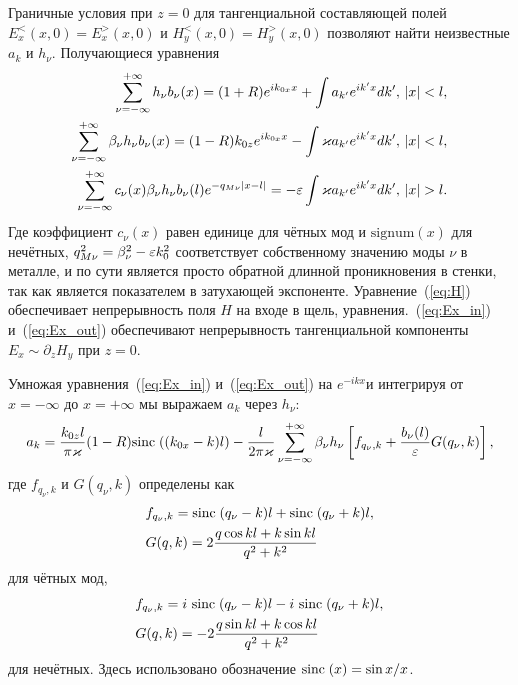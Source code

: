  Граничные условия при $z = 0$ для тангенциальной составляющей полей $E_x^<(x,0) = E_x^>(x,0) $ и $H_y^<(x,0) = H_y^>(x,0)$ 
 позволяют найти неизвестные $a_k$ и $h_\nu$. Получающиеся уравнения
\begin{align}
\sum_{\nu = -\infty}^{+\infty} h_\nu b_\nu (x) = (1+R)e^{ik_{0x}x} 
+ \int a_{k'} e^{ik'x} dk', & \ \abs{x}<l, \label{eq:H} \\
\sum_{\nu = -\infty}^{+\infty} \beta_\nu h_\nu b_\nu(x) = (1-R)k_{0z}e^{ik_{0x}x}
- \int \varkappa a_{k'} e^{ik'x} dk', &\ \abs{x}<l,  \label{eq:Ex_in} \\
\sum_{\nu = -\infty}^{+\infty} c_\nu(x)\beta_\nu h_\nu b_\nu(l) e^{-q_{M\nu}\abs{x-l}} = 
 -\eps \int \varkappa a_{k'} e^{ik'x} dk', &\ \abs{x}>l. \label{eq:Ex_out}
\end{align}
Где коэффициент $c_\nu(x)$ равен единице для чётных мод и $\text{signum}(x)$ для нечётных, $q_{M\nu}^2 = \beta_\nu^2 - \varepsilon k_0^2$
соответствует собственному значению моды $\nu$ в металле, и по сути является просто обратной длинной проникновения в стенки, так как 
является показателем в затухающей экспоненте. Уравнение~(\ref{eq:H}) обеспечивает непрерывность поля $H$ на входе в щель, 
уравнения.~(\ref{eq:Ex_in}) и~(\ref{eq:Ex_out}) обеспечивают непрерывность тангенциальной компоненты $E_x \sim \partial_{z} H_y$ при $z = 0$.

Умножая уравнения~(\ref{eq:Ex_in}) и~(\ref{eq:Ex_out}) на $e^{-ikx}$и интегрируя от $x = -\infty$ до $x = +\infty$  
мы выражаем $a_k$ через $h_\nu$:
\begin{align}
a_k = \frac{k_{0z}l }{\pi \varkappa} (1-R)\mathrm{sinc}\;((k_{0x}-k)l) 
        - \frac{l}{2 \pi \varkappa}\sum_{\nu = -\infty}^{+\infty} \beta_\nu h_\nu\left[f_{q_\nu,k}
+ \frac{b_\nu(l)}{\varepsilon}G(q_\nu,k)\right],
\end{align}
где $f_{q_\nu,k}$ и $G(q_\nu,k)$ определены как 
\begin{align*}
&f_{q_\nu,k} =
\mathrm{sinc}\;(q_\nu-k)l + \mathrm{sinc}\;(q_\nu+k)l,\\
&G(q,k) = 2\frac{q\cos{kl}+k\sin{kl}}{q^2 + k^2}\\
\end{align*}
для чётных мод,
\begin{align}
&f_{q_\nu,k} = i\ \mathrm{sinc}\;(q_\nu-k)l - i\ \mathrm{sinc}\;(q_\nu+k)l,\nonumber\\
& G(q,k) = -2\frac{q\sin{kl}+k\cos{kl}}{q^2 + k^2}
\end{align}
для нечётных.
Здесь использовано обозначение  $\mathrm{sinc}\;(x) = {\sin{x}}/{x}$.

